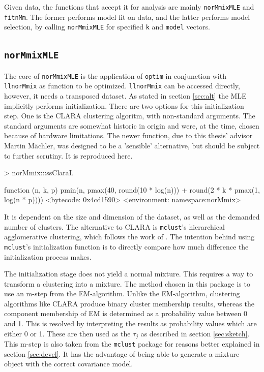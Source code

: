 Given data, the functions that accept it for analysis are mainly 
{\tt norMmixMLE} and {\tt fitnMm}. The former performs model fit on data, and 
the latter performs model selection, by calling {\tt norMmixMLE} for specified
{\tt k} and {\tt model} vectors. 

\subsection{{\tt norMmixMLE}}

The core of {\tt norMmixMLE} is the application of {\tt optim} in conjunction
with {\tt llnorMmix} as function to be optimized. {\tt llnorMmix} can be 
accessed directly, however, it needs a transposed dataset.
As stated in section \ref{sec:alt} the MLE implicitly performs initialization.
There are two options for this initialization step. One is the CLARA clustering
algoritm, with non-standard arguments. The standard arguments are somewhat 
historic in origin and were, at the time, chosen because of hardware 
limitations. The newer function, due to this thesis' advisor Martin M\"achler, 
was designed to be a 'sensible' alternative, but should be subject to further 
scrutiny. It is reproduced here.

\begin{Schunk}
\begin{Sinput}
>     norMmix:::ssClaraL
\end{Sinput}
\begin{Soutput}
function (n, k, p) 
pmin(n, pmax(40, round(10 * log(n))) + round(2 * k * pmax(1, 
    log(n * p))))
<bytecode: 0x4cd1590>
<environment: namespace:norMmix>
\end{Soutput}
\end{Schunk}

It is dependent on the size and dimension of the dataset, as well as the 
demanded number of clusters.
The alternative to CLARA is {\tt mclust}'s hierarchical agglomerative 
clustering, which follows the work of \cite{Fra98}. The intention behind using 
{\tt mclust}'s initialization function is to directly compare how much 
difference the initialization process makes.

The initialization stage does not yield a normal mixture. This requires a way
to transform a clustering into a mixture. The method chosen in this package is
to use an m-step from the EM-algorithm. Unlike the EM-algorithm, clustering 
algorithms like CLARA produce binary cluster membership results, whereas the 
component membership of EM is determined as a probability value between 0 and 1.
This is resolved by interpreting the results as probability values which are 
either 0 or 1. These are then used as the $\tau_j$ as described in section 
\ref{sec:sketch}. This m-step is also taken from the {\tt mclust} package for 
reasons better explained in section \ref{sec:devel}.
It has the advantage of being able to generate a mixture object with the 
correct covariance model.

